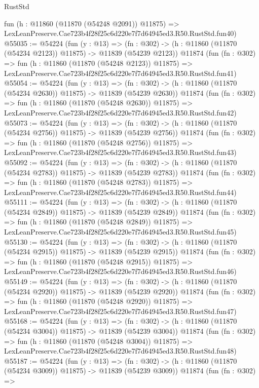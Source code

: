 \begin{lexlean}{RustStd}
\begin{coremodule}
    fun (h : @11860 (@11870 (@54248 @2091)) @11875) =>
    LexLeanPreserve.Cae723b4f28f25c6d220e7f7d64945ed3.R50.RustStd.fun40)
@55035 := @54224
    (fun (y : @13) =>
    (fn : @302) -> (h : @11860 (@11870 (@54234 @2123)) @11875) -> @11839 (@54239 @2123))
    @11874
    (fun (fn : @302) =>
    fun (h : @11860 (@11870 (@54248 @2123)) @11875) =>
    LexLeanPreserve.Cae723b4f28f25c6d220e7f7d64945ed3.R50.RustStd.fun41)
@55054 := @54224
    (fun (y : @13) =>
    (fn : @302) -> (h : @11860 (@11870 (@54234 @2630)) @11875) -> @11839 (@54239 @2630))
    @11874
    (fun (fn : @302) =>
    fun (h : @11860 (@11870 (@54248 @2630)) @11875) =>
    LexLeanPreserve.Cae723b4f28f25c6d220e7f7d64945ed3.R50.RustStd.fun42)
@55073 := @54224
    (fun (y : @13) =>
    (fn : @302) -> (h : @11860 (@11870 (@54234 @2756)) @11875) -> @11839 (@54239 @2756))
    @11874
    (fun (fn : @302) =>
    fun (h : @11860 (@11870 (@54248 @2756)) @11875) =>
    LexLeanPreserve.Cae723b4f28f25c6d220e7f7d64945ed3.R50.RustStd.fun43)
@55092 := @54224
    (fun (y : @13) =>
    (fn : @302) -> (h : @11860 (@11870 (@54234 @2783)) @11875) -> @11839 (@54239 @2783))
    @11874
    (fun (fn : @302) =>
    fun (h : @11860 (@11870 (@54248 @2783)) @11875) =>
    LexLeanPreserve.Cae723b4f28f25c6d220e7f7d64945ed3.R50.RustStd.fun44)
@55111 := @54224
    (fun (y : @13) =>
    (fn : @302) -> (h : @11860 (@11870 (@54234 @2849)) @11875) -> @11839 (@54239 @2849))
    @11874
    (fun (fn : @302) =>
    fun (h : @11860 (@11870 (@54248 @2849)) @11875) =>
    LexLeanPreserve.Cae723b4f28f25c6d220e7f7d64945ed3.R50.RustStd.fun45)
@55130 := @54224
    (fun (y : @13) =>
    (fn : @302) -> (h : @11860 (@11870 (@54234 @2915)) @11875) -> @11839 (@54239 @2915))
    @11874
    (fun (fn : @302) =>
    fun (h : @11860 (@11870 (@54248 @2915)) @11875) =>
    LexLeanPreserve.Cae723b4f28f25c6d220e7f7d64945ed3.R50.RustStd.fun46)
@55149 := @54224
    (fun (y : @13) =>
    (fn : @302) -> (h : @11860 (@11870 (@54234 @2920)) @11875) -> @11839 (@54239 @2920))
    @11874
    (fun (fn : @302) =>
    fun (h : @11860 (@11870 (@54248 @2920)) @11875) =>
    LexLeanPreserve.Cae723b4f28f25c6d220e7f7d64945ed3.R50.RustStd.fun47)
@55168 := @54224
    (fun (y : @13) =>
    (fn : @302) -> (h : @11860 (@11870 (@54234 @3004)) @11875) -> @11839 (@54239 @3004))
    @11874
    (fun (fn : @302) =>
    fun (h : @11860 (@11870 (@54248 @3004)) @11875) =>
    LexLeanPreserve.Cae723b4f28f25c6d220e7f7d64945ed3.R50.RustStd.fun48)
@55187 := @54224
    (fun (y : @13) =>
    (fn : @302) -> (h : @11860 (@11870 (@54234 @3009)) @11875) -> @11839 (@54239 @3009))
    @11874
    (fun (fn : @302) =>

\end{coremodule}
\end{lexlean}
